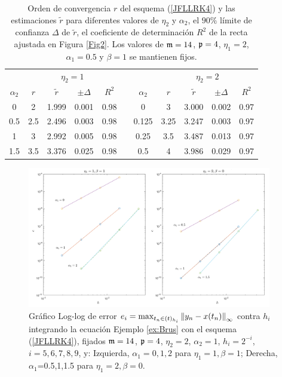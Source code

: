\begin{table}[htb]
	\centering
	\caption{
		Orden de convergencia $r$ del esquema (\ref{JFLLRK4}) y las estimaciones $\widetilde{r}$ para diferentes valores de $\eta_2$ y $\alpha_2$, el $90\%$ límite de confianza $\Delta$ de $\widetilde{r}$, el coeficiente de determinación $R^2$ de la recta ajustada en Figura \ref{Fig2}. Los valores de $\mathfrak{m}=14$, $\mathfrak{p}=4$, $\eta_1=2$, $\alpha_1=0.5$ y $\beta=1$ se mantienen fijos. }
	\begin{adjustbox}{width=0.8\columnwidth,center}
		\begin{tabular}{ c  c c c c  c  c c c c c}
			\hline
			& \multicolumn{4}{c}{$\eta_2=1$} & & & \multicolumn{4}{c}{$\eta_2=2$} \\
			\cline{2-5} \cline{8-11}
			$\alpha_2$ & $r$ & $\widetilde{r}$ & $\pm\varDelta$ & $R^2$ & & $\alpha_2$ & $r$ & $\widetilde{r}$ & $\pm\varDelta$ & $R^2$ \\
			\hline
			0 & 2 & 1.999 & 0.001 & 0.98 & & 0 & 3 & 3.000 & 0.002 & 0.97 \\
			0.5 & 2.5 & 2.496 & 0.003 & 0.98 & & 0.125 & 3.25 & 3.247 & 0.003 & 0.97 \\
			1 & 3 & 2.992 & 0.005 & 0.98 & & 0.25 & 3.5 & 3.487 & 0.013 & 0.97 \\
			1.5 & 3.5 & 3.376 & 0.025 & 0.98 & & 0.5 & 4 & 3.986 & 0.029 & 0.97 \\
			\hline
		\end{tabular}
	\end{adjustbox}
	\label{tab:out}
\end{table}


\begin{figure}[htb]
	\centering
	\includegraphics[width=0.95\textwidth]{Graphics/lldp-fj/in_new.png}
	\caption{Gráfico Log-log de error $e_i=\max_{t_n\in(t)_{h_i}}\left\lVert y_n-x(t_n) \right\rVert_\infty$ contra $h_i$ integrando la ecuación Ejemplo \ref{ex:Brus} con el esquema (\ref{JFLLRK4}), fijados $\mathfrak{m}=14$, $\mathfrak{p}=4$, $\eta_2=2$, $\alpha_2=1$, $h_i=2^{-i}$, $i=5,6,7,8,9$, y: Izquierda, $\alpha_1=0,1,2$ para $\eta_1=1,\beta=1$; Derecha, $\alpha_1$=0.5,1,1.5 para $\eta_1=2,\beta=0$.}
	\label{Fig3}
\end{figure}


